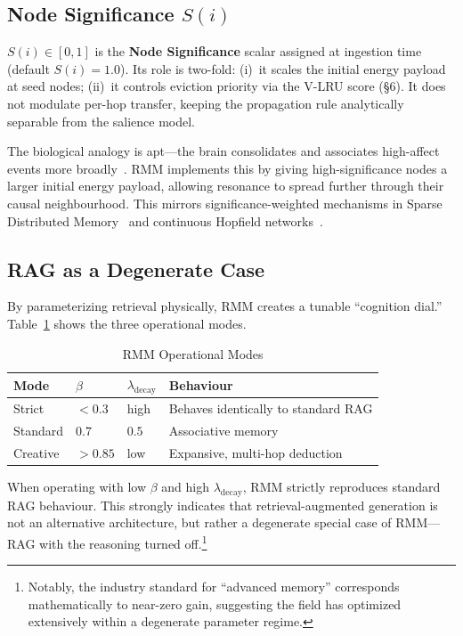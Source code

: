 \documentclass[11pt]{article}
\begin{document}
\subsection{Node Significance \texorpdfstring{$S(i)$}{S(i)}}

$S(i) \in [0,1]$ is the \textbf{Node Significance} scalar assigned at
ingestion time (default $S(i) = 1.0$). Its role is two-fold: (i)~it
scales the initial energy payload at seed nodes; (ii)~it controls
eviction priority via the V-LRU score (\S6). It does not modulate
per-hop transfer, keeping the propagation rule analytically separable
from the salience model.

The biological analogy is apt---the brain consolidates and associates
high-affect events more broadly~\cite{collins1975}. RMM implements this
by giving high-significance nodes a larger initial energy payload,
allowing resonance to spread further through their causal neighbourhood.
This mirrors significance-weighted mechanisms in Sparse Distributed
Memory~\cite{kanerva1988} and continuous Hopfield
networks~\cite{ramsauer2020hopfield}.

\subsection{RAG as a Degenerate Case}

By parameterizing retrieval physically, RMM creates a tunable
``cognition dial.'' Table~\ref{tab:modes} shows the three operational
modes.

\begin{table}[h]
\centering
\caption{RMM Operational Modes}
\label{tab:modes}
\begin{tabular}{llll}
\toprule
\textbf{Mode} & \textbf{$\beta$} & \textbf{$\lambda_{\text{decay}}$} & \textbf{Behaviour} \\
\midrule
Strict   & $< 0.3$ & high & Behaves identically to standard RAG \\
Standard & $0.7$   & $0.5$  & Associative memory \\
Creative & $> 0.85$ & low  & Expansive, multi-hop deduction \\
\bottomrule
\end{tabular}
\end{table}

When operating with low $\beta$ and high $\lambda_{\text{decay}}$, RMM
strictly reproduces standard RAG behaviour. This strongly indicates that
retrieval-augmented generation is not an alternative architecture, but
rather a degenerate special case of RMM---RAG with the reasoning turned
off.\footnote{Notably, the industry standard for ``advanced memory''
corresponds mathematically to near-zero gain, suggesting the field has
optimized extensively within a degenerate parameter regime.}
\end{document}
